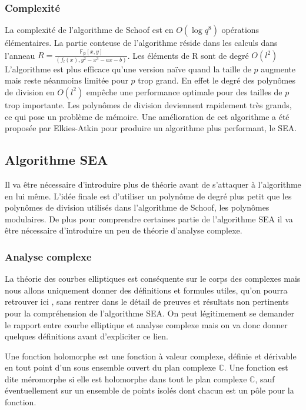 \documentclass[12pt]{article}
\begin{document}
\subsubsection{Complexité}
La complexité de l'algorithme de Schoof est en $O(\log{q}^8)$ opérations élémentaires. La partie conteuse de l'algorithme réside dans les calculs dans l'anneau $R = \frac{\mathbb{F_p}[x,y]}{(f_l(x), y^2 -x^3 -ax -b)}$. Les éléments de R sont de degré $O(l^2)$ 
\newline
 L'algorithme est plus efficace qu'une version naïve quand la taille de $p$ augmente mais reste néanmoins limitée pour $p$ trop grand. En effet le degré des polynômes de division en $O(l^2)$ empêche une performance optimale pour des tailles de $p$ trop importante. Les polynômes de division deviennent rapidement très grands, ce qui pose un problème de mémoire. Une amélioration de cet algorithme a été proposée par Elkies-Atkin pour produire un algorithme plus performant, le SEA. 
 
\subsection{Algorithme SEA}
Il va être nécessaire d'introduire plus de théorie avant de s'attaquer à l'algorithme en lui même. L'idée finale est d'utiliser un polynôme de degré plus petit que les polynômes de division utilisés dans l'algorithme de Schoof, les polynômes modulaires. De plus pour comprendre certaines partie de l'algorithme SEA il va être nécessaire d'introduire un peu de théorie d'analyse complexe.


\subsubsection{Analyse complexe}
La théorie des courbes elliptiques est conséquente sur le corps des complexes mais nous allons uniquement donner des définitions et formules utiles, qu'on pourra retrouver ici \cite{complexbook} \cite{csi}, sans rentrer dans le détail de preuves et résultats non pertinents pour la compréhension de l'algorithme SEA. On peut légitimement se demander le rapport entre courbe elliptique et analyse complexe mais on va donc donner quelques définitions avant d'expliciter ce lien.

\begin{defi}
Une fonction holomorphe est une fonction à valeur complexe, définie et dérivable en tout point d'un sous ensemble ouvert du plan complexe $\mathbb{C}$. Une fonction est dite méromorphe si elle est holomorphe dans tout le plan complexe $\mathbb{C}$, sauf éventuellement sur un ensemble de points isolés dont chacun est un pôle pour la fonction.
\end{defi}
\end{document}
